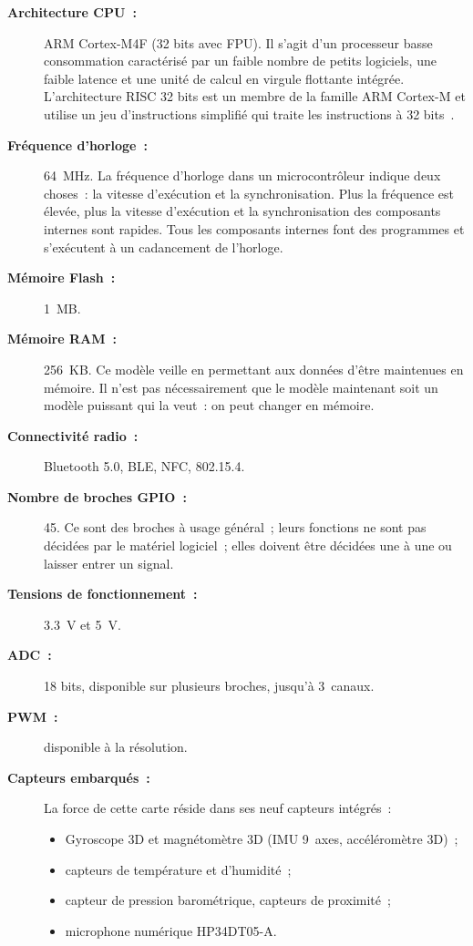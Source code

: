 \documentclass[a4paper,12pt,twoside]{report}
\theoremstyle{definition}
\theoremstyle{plain}
\theoremstyle{remark}
\begin{document}
\begin{description}
	\item[\textbf{Architecture \ac{CPU}~:}] ARM Cortex-M4F (32 bits avec \ac{FPU}).
	Il s'agit d'un processeur basse consommation caractérisé par un faible nombre de
	petits logiciels, une faible latence et une unité de calcul en virgule flottante
	intégrée. L'architecture RISC 32 bits est un membre de la famille ARM Cortex-M et
	utilise un jeu d'instructions simplifié qui traite les instructions à 32 bits~\cite{arm_cortex}.

	\item[\textbf{Fréquence d'horloge~:}] \SI{64}{MHz}. La fréquence d'horloge dans un
	microcontrôleur indique deux choses~: la vitesse d'exécution et la synchronisation.
	Plus la fréquence est élevée, plus la vitesse d'exécution et la synchronisation des
	composants internes sont rapides. Tous les composants internes font des programmes et
	s'exécutent à un cadancement de l'horloge.

	\item[\textbf{Mémoire Flash~:}] \SI{1}{MB}.

	\item[\textbf{Mémoire \acs{RAM}~:}] \SI{256}{KB}. Ce modèle veille en permettant
	aux données d'être maintenues en mémoire. Il n'est pas nécessairement que le modèle
	maintenant soit un modèle puissant qui la veut~: on peut changer en mémoire.

	\item[\textbf{Connectivité radio~:}] Bluetooth 5.0, \ac{BLE}, \ac{NFC}, 802.15.4.

	\item[\textbf{Nombre de broches \acs{GPIO}~:}] 45. Ce sont des broches à usage
	général~; leurs fonctions ne sont pas décidées par le matériel logiciel~; elles
	doivent être décidées une à une ou laisser entrer un signal.

	\item[\textbf{Tensions de fonctionnement~:}] \SI{3.3}{V} et \SI{5}{V}.

	\item[\textbf{\acs{ADC}~:}] 18 bits, disponible sur plusieurs broches, jusqu'à
	3~canaux.

	\item[\textbf{\acs{PWM}~:}] disponible à la résolution.

	\item[\textbf{Capteurs embarqués~:}] La force de cette carte réside dans ses neuf
	capteurs intégrés~:
	\begin{itemize}
		\item Gyroscope 3D et magnétomètre 3D (\ac{IMU} 9~axes, accéléromètre 3D)~;
		\item capteurs de température et d'humidité~;
		\item capteur de pression barométrique, capteurs de proximité~;
		\item microphone numérique HP34DT05-A.
	\end{itemize}
\end{description}
\end{document}

